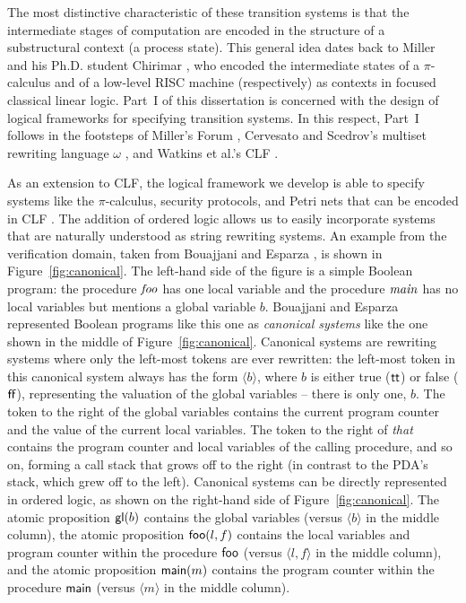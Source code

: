 The most distinctive characteristic of these transition systems is
that the intermediate stages of computation are encoded in the
structure of a substructural context (a process state). This general
idea dates back to Miller \cite{miller92pi} and his Ph.D. student
Chirimar \cite{chirimar95proof}, who encoded the intermediate states
of a $\pi$-calculus and of a low-level RISC machine (respectively) as
contexts in focused classical linear logic.  Part~I of this dissertation
is
concerned with the design of logical frameworks for specifying
transition systems.  In this respect, Part~I follows
in the footsteps of Miller's Forum \cite{miller96forum}, Cervesato and
Scedrov's multiset rewriting language $\omega$
\cite{cervesato09relating}, and Watkins et al.'s CLF
\cite{watkins02concurrent}. 



As an extension to CLF, the logical framework we develop is able to
specify systems like the $\pi$-calculus, security protocols, and Petri
nets that can be encoded in CLF \cite{cervesato02concurrent}. The
addition of ordered logic allows us to easily incorporate systems that
are naturally understood as string rewriting systems. An example from
the verification domain, taken from Bouajjani and Esparza
\cite{bouajjani06rewriting}, is shown in Figure~\ref{fig:canonical}.
The left-hand side of the figure is a simple Boolean program: the
procedure ${\it foo}$ has one local variable and the procedure ${\it
  main}$ has no local variables but mentions a global variable $b$.
Bouajjani and Esparza represented Boolean programs like this one as
{\it canonical systems} like the one shown in the middle of
Figure~\ref{fig:canonical}. Canonical systems are rewriting systems
where only the left-most tokens are ever rewritten: the left-most
token in this canonical system always has the form $\langle b \rangle$,
where $b$ is either true (${\sf tt}$) or false (${\sf ff}$),
representing the valuation of the global variables -- there is only 
one, $b$.  The token to the
right of the global variables contains the current program counter and
the value of the current local variables. The token to the right of
{\it that} contains the program counter and local variables of the calling
procedure, and so on, forming a call stack that grows off to the right
(in contrast to the PDA's stack, which grew off to the left). Canonical
systems can be directly represented in ordered logic, as
shown on the right-hand side of Figure~\ref{fig:canonical}. The atomic
proposition ${\sf gl}(b)$ contains the global variables (versus
$\langle b \rangle$ in the middle column), the atomic proposition
${\sf foo}(l, f)$ contains the local variables and program counter
within the procedure ${\sf foo}$ (versus $\langle l, f \rangle$ in the
middle column), and the atomic proposition ${\sf main}(m)$ contains
the program counter within the procedure ${\sf main}$ (versus $\langle
m \rangle$ in the middle column).

